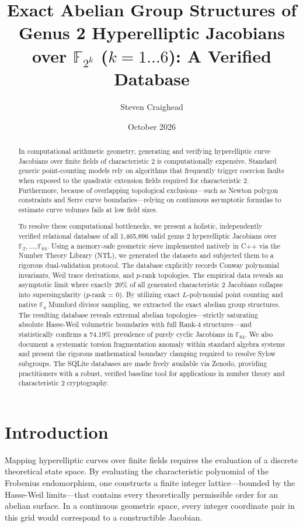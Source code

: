 \documentclass[11pt,letterpaper]{article}
\title{Exact Abelian Group Structures of Genus 2 Hyperelliptic Jacobians over \texorpdfstring{$\mathbb{F}_{2^k}$}{F\_2\textasciicircum k} (\texorpdfstring{$k=1 \dots 6$}{k=1..6}): A Verified Database}
\author{Steven Craighead}
\date{October 2026}
\begin{document}
\raggedright

\maketitle

\begin{abstract}
In computational arithmetic geometry, generating and verifying hyperelliptic curve Jacobians over finite fields of characteristic 2 is computationally expensive. Standard generic point-counting models rely on algorithms that frequently trigger coercion faults when exposed to the quadratic extension fields required for characteristic 2. Furthermore, because of overlapping topological exclusions---such as Newton polygon constraints and Serre curve boundaries---relying on continuous asymptotic formulas to estimate curve volumes fails at low field sizes. 

To resolve these computational bottlenecks, we present a holistic, independently verified relational database of all 1,465,896 valid genus 2 hyperelliptic Jacobians over $\mathbb{F}_2, \dots, \mathbb{F}_{64}$. Using a memory-safe geometric sieve implemented natively in C++ via the Number Theory Library (NTL), we generated the datasets and subjected them to a rigorous dual-validation protocol. The database explicitly records Conway polynomial invariants, Weil trace derivations, and $p$-rank topologies. The empirical data reveals an asymptotic limit where exactly 20\% of all generated characteristic 2 Jacobians collapse into supersingularity ($p$-rank = 0). By utilizing exact $L$-polynomial point counting and native $\mathbb{F}_q$ Mumford divisor sampling, we extracted the exact abelian group structures. The resulting database reveals extremal abelian topologies---strictly saturating absolute Hasse-Weil volumetric boundaries with full Rank-4 structures---and statistically confirms a 74.19\% prevalence of purely cyclic Jacobians in $\mathbb{F}_{64}$. We also document a systematic torsion fragmentation anomaly within standard algebra systems and present the rigorous mathematical boundary clamping required to resolve Sylow subgroups. The SQLite databases are made freely available via Zenodo, providing practitioners with a robust, verified baseline tool for applications in number theory and characteristic 2 cryptography.
\end{abstract}

\section{Introduction}
Mapping hyperelliptic curves over finite fields requires the evaluation of a discrete theoretical state space. By evaluating the characteristic polynomial of the Frobenius endomorphism, one constructs a finite integer lattice---bounded by the Hasse-Weil limits---that contains every theoretically permissible order for an abelian surface. In a continuous geometric space, every integer coordinate pair in this grid would correspond to a constructible Jacobian.
\end{document}

